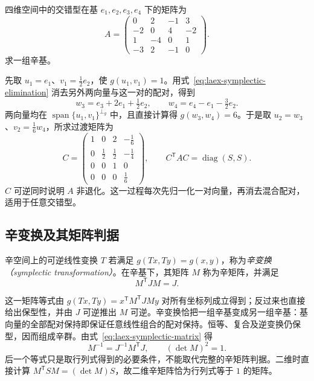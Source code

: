 \begin{example}
\label{ex:laex-symplectic-basis}
四维空间中的交错型在基 $e_1,e_2,e_3,e_4$ 下的矩阵为
\[
 A=\begin{pmatrix}
 0&2&-1&3\\-2&0&4&-2\\1&-4&0&1\\-3&2&-1&0
 \end{pmatrix}.
\]
求一组辛基。
\end{example}
\begin{solve}
先取 $u_1=e_1$、$v_1=\tfrac12e_2$，使 $g(u_1,v_1)=1$。用式~\eqref{eq:laex-symplectic-elimination} 消去另外两向量与这一对的配对，得到
\[
 w_3=e_3+2e_1+\tfrac12e_2,\qquad
 w_4=e_4-e_1-\tfrac32e_2.
\]
两向量均在 $\operatorname{span}\{u_1,v_1\}^{\perp_g}$ 中，且直接计算得 $g(w_3,w_4)=6$。于是取 $u_2=w_3$、$v_2=\tfrac16w_4$，所求过渡矩阵为
\[
 C=\begin{pmatrix}
 1&0&2&-\tfrac16\\
 0&\tfrac12&\tfrac12&-\tfrac14\\
 0&0&1&0\\
 0&0&0&\tfrac16
 \end{pmatrix},\qquad
 C^{\mathsf T}AC=\operatorname{diag}(S,S).
\]
$C$ 可逆同时说明 $A$ 非退化。这一过程每次先归一化一对向量，再消去混合配对，适用于任意交错型。
\end{solve}

\subsection{辛变换及其矩阵判据}

\begin{definition}
辛空间上的可逆线性变换 $T$ 若满足 $g(Tx,Ty)=g(x,y)$，称为\emph{辛变换（symplectic transformation）}。在辛基下，其矩阵 $M$ 称为辛矩阵，并满足
\begin{equation}
 M^{\mathsf T}JM=J.
 \label{eq:laex-symplectic-matrix}
\end{equation}
\end{definition}

这一矩阵等式由 $g(Tx,Ty)=x^{\mathsf T}M^{\mathsf T}JMy$ 对所有坐标列成立得到；反过来也直接给出保型性，并由 $J$ 可逆推出 $M$ 可逆。辛变换恰把一组辛基变成另一组辛基：基向量的全部配对保持即保证任意线性组合的配对保持。恒等、复合及逆变换仍保型，因而组成辛群。由式~\eqref{eq:laex-symplectic-matrix} 得
\[
 M^{-1}=J^{-1}M^{\mathsf T}J,\qquad (\det M)^2=1.
\]
后一个等式只是取行列式得到的必要条件，不能取代完整的辛矩阵判据。二维时直接计算 $M^{\mathsf T}SM=(\det M)S$，故二维辛矩阵恰为行列式等于 $1$ 的矩阵。


